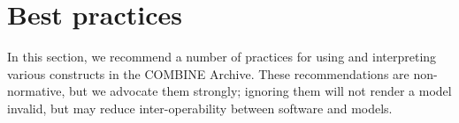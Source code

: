 
\section{Best practices}
\label{best-practices}

In this section, we recommend a number of practices for using and 
interpreting various constructs in the COMBINE Archive. These 
recommendations are non-normative, but we advocate them strongly; 
ignoring them will not render a model invalid, but may reduce 
inter-operability between software and models. 

